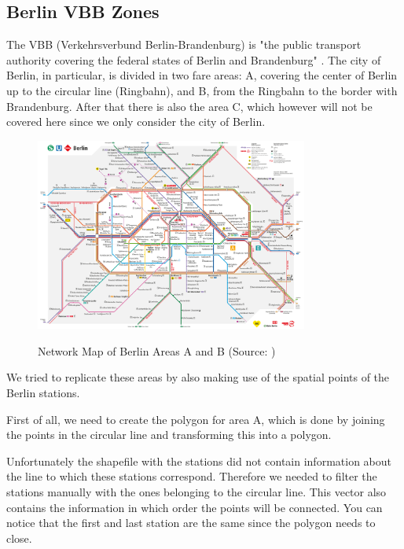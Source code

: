 \subsection{Berlin VBB Zones}\label{subsec:vbb}

The VBB (Verkehrsverbund Berlin-Brandenburg) is "the public transport authority covering the federal states of Berlin and Brandenburg" \citep{vbb:2019}. The city of Berlin, in particular, is divided in two fare areas: A, covering the center of Berlin up to the circular line (Ringbahn), and B, from the Ringbahn to the border with Brandenburg. After that there is also the area C, which however will not be covered here since we only consider the city of Berlin.

\begin{figure}[H]
\begin{center}
\includegraphics[width=0.8\textwidth, keepaspectratio]{S_und_U-Bahnnetz_mit_Regionalbahn_Innenstadt.pdf} \\
\caption{Network Map of Berlin Areas A and B (Source: \cite{vbb:2019})}
\end{center}
\end{figure}

We tried to replicate these areas by also making use of the spatial points of the Berlin stations.

First of all, we need to create the polygon for area A, which is done by joining the points in the circular line and transforming this into a polygon.

Unfortunately the shapefile with the stations did not contain information about the line to which these stations correspond. Therefore we needed to filter the stations manually with the ones belonging to the circular line. This vector also contains the information in which order the points will be connected. You can notice that the first and last station are the same since the polygon needs to close.

